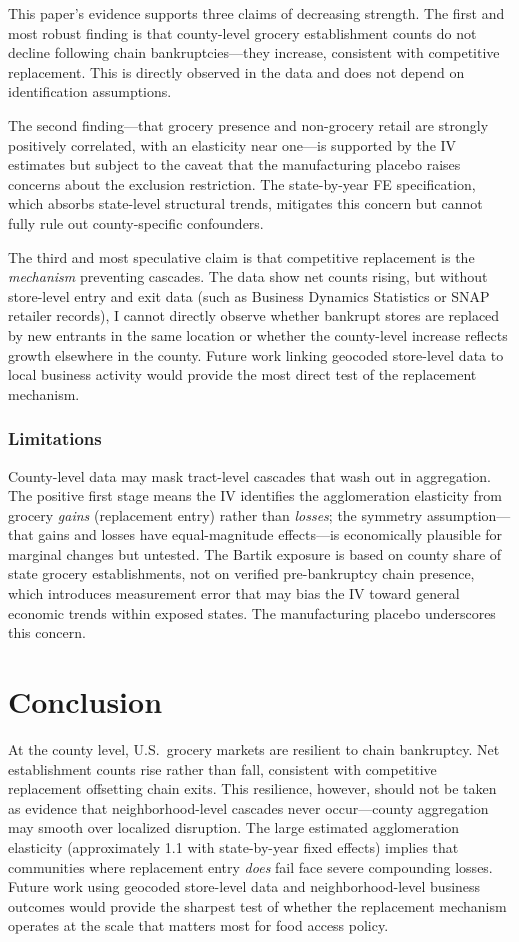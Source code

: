 \documentclass[12pt]{article}
\begin{document}
This paper's evidence supports three claims of decreasing strength. The first and most robust finding is that county-level grocery establishment counts do not decline following chain bankruptcies---they increase, consistent with competitive replacement. This is directly observed in the data and does not depend on identification assumptions.

The second finding---that grocery presence and non-grocery retail are strongly positively correlated, with an elasticity near one---is supported by the IV estimates but subject to the caveat that the manufacturing placebo raises concerns about the exclusion restriction. The state-by-year FE specification, which absorbs state-level structural trends, mitigates this concern but cannot fully rule out county-specific confounders.

The third and most speculative claim is that competitive replacement is the \emph{mechanism} preventing cascades. The data show net counts rising, but without store-level entry and exit data (such as Business Dynamics Statistics or SNAP retailer records), I cannot directly observe whether bankrupt stores are replaced by new entrants in the same location or whether the county-level increase reflects growth elsewhere in the county. Future work linking geocoded store-level data to local business activity would provide the most direct test of the replacement mechanism.

\subsubsection*{Limitations} County-level data may mask tract-level cascades that wash out in aggregation. The positive first stage means the IV identifies the agglomeration elasticity from grocery \emph{gains} (replacement entry) rather than \emph{losses}; the symmetry assumption---that gains and losses have equal-magnitude effects---is economically plausible for marginal changes but untested. The Bartik exposure is based on county share of state grocery establishments, not on verified pre-bankruptcy chain presence, which introduces measurement error that may bias the IV toward general economic trends within exposed states. The manufacturing placebo underscores this concern.


\section{Conclusion}

At the county level, U.S.\ grocery markets are resilient to chain bankruptcy. Net establishment counts rise rather than fall, consistent with competitive replacement offsetting chain exits. This resilience, however, should not be taken as evidence that neighborhood-level cascades never occur---county aggregation may smooth over localized disruption. The large estimated agglomeration elasticity (approximately 1.1 with state-by-year fixed effects) implies that communities where replacement entry \emph{does} fail face severe compounding losses. Future work using geocoded store-level data and neighborhood-level business outcomes would provide the sharpest test of whether the replacement mechanism operates at the scale that matters most for food access policy.
\end{document}
